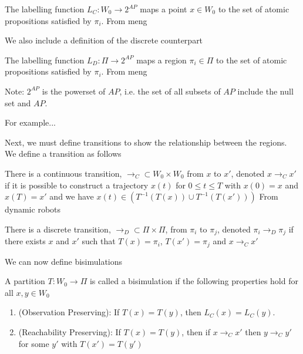 \theoremstyle{definition}
\begin{definition}
\label{defCLF}
The labelling function $L_C:W_0 \rightarrow 2^{AP}$ maps a point $x \in W_0$ to the set of atomic propositions satisfied by $\pi_i$. From meng
\end{definition} 

We also include a definition of the discrete counterpart 

\theoremstyle{definition}
\begin{definition}
\label{defDLF}
The labelling function $L_D:\Pi\rightarrow 2^{AP}$ maps a region $\pi_i \in \Pi$ to the set of atomic propositions satisfied by $\pi_i$. From meng
\end{definition} 
Note: $2^{AP}$ is the powerset of $AP$, i.e. the set of all subsets of $AP$ include the null set and $AP$.

For example...

Next, we must define transitions to show the relationship between the regions. We define a transition as follows
\theoremstyle{definition}
\begin{definition}
\label{defCTransition}
There is a continuous transition, $\rightarrow_C \subset W_0 \times W_0$ from $x$ to $x'$, denoted $x \rightarrow_C x'$ if it is possible to construct a trajectory $x(t)$ for $0 \leq t \leq T$ with $x(0)=x$ and $x(T) =x'$ and we have $x(t) \in (T^{-1}(T(x))\cup T^{-1}(T(x')))$
 From dynamic robots
\end{definition}

\theoremstyle{definition}
\begin{definition}
\label{defDTransition}
There is a discrete transition, $\rightarrow_D \subset \Pi \times \Pi$, from $\pi_i$ to $\pi_j$, denoted $\pi_i \rightarrow_D \pi_j$ if there exists $x$ and $x'$ such that $T(x) = \pi_i$, $T(x')=\pi_j$ and $x \rightarrow_C x'$
\end{definition}

We can now define bisimulations
\theoremstyle{definition}
\begin{definition}
\label{defDTransition}
A partition $T:W_0\rightarrow \Pi$ is called a bisimulation if the following properties hold for all $x,y \in W_0$
\begin{enumerate}
    \item (Observation Preserving): If $T(x)=T(y)$, then $L_C(x) = L_C(y)$.
    \item (Reachability Preserving): If $T(x) = T(y)$, then if $x\rightarrow_C x'$ then $y \rightarrow_C y'$ for some $y'$ with $T(x')=T(y')$
\end{enumerate}
\end{definition}

